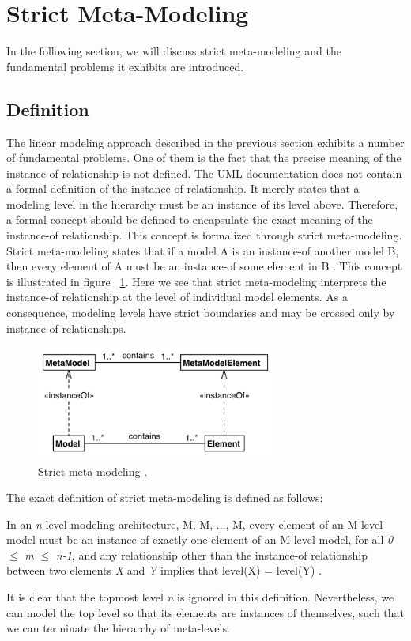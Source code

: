 \section{Strict Meta-Modeling}

In the following section, we will discuss strict meta-modeling and the fundamental problems it exhibits are introduced.

\subsection{Definition}

The linear modeling approach described in the previous section exhibits a number of fundamental problems. One of them is the fact that the precise meaning of the instance-of relationship is not defined. The UML documentation does not contain a formal definition of the instance-of relationship. It merely states that a modeling level in the hierarchy must be an instance of its level above. Therefore, a formal concept should be defined to encapsulate the exact meaning of the instance-of relationship. This concept is formalized through strict meta-modeling. Strict meta-modeling states that if a model A is an instance-of another model B, then every element of A must be an instance-of some element in B \cite{RearchitectingUML}. This concept is illustrated in figure ~\ref{fig:strict_mm}. Here we see that strict meta-modeling interprets the instance-of relationship at the level of individual model elements. As a consequence, modeling levels have strict boundaries and may be crossed only by instance-of relationships.
\begin{figure}[h!]
\centering
\includegraphics[width=0.7\textwidth]{images/chap2_strict_mm.png}
\caption{Strict meta-modeling \cite{RearchitectingUML}.}
\label{fig:strict_mm}
\end{figure}
The exact definition of strict meta-modeling is defined as follows:
\begin{mydef}
In an \textit{n}-level modeling architecture, M, M, ..., M, every element of an M-level model must be an instance-of exactly one element of an M-level model, for all \textit{0} $\leq$ \textit{m} $\le$ \textit{n-1}, and any relationship other than the instance-of relationship between two elements \textit{X} and \textit{Y} implies that level(X) = level(Y) \cite{RearchitectingUML}.
\end{mydef}
It is clear that the topmost level \textit{n} is ignored in this definition. Nevertheless, we can model the top level so that its elements are instances of themselves, such that we can terminate the hierarchy of meta-levels.

